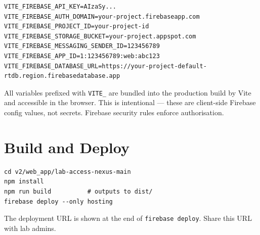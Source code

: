 \begin{lstlisting}[caption={v2/web\_app/lab-access-nexus-main/.env}]
VITE_FIREBASE_API_KEY=AIzaSy...
VITE_FIREBASE_AUTH_DOMAIN=your-project.firebaseapp.com
VITE_FIREBASE_PROJECT_ID=your-project-id
VITE_FIREBASE_STORAGE_BUCKET=your-project.appspot.com
VITE_FIREBASE_MESSAGING_SENDER_ID=123456789
VITE_FIREBASE_APP_ID=1:123456789:web:abc123
VITE_FIREBASE_DATABASE_URL=https://your-project-default-rtdb.region.firebasedatabase.app
\end{lstlisting}

All variables prefixed with \texttt{VITE\_} are bundled into the production build by Vite and accessible in the browser. This is intentional --- these are client-side Firebase config values, not secrets. Firebase security rules enforce authorisation.

\section{Build and Deploy}

\begin{lstlisting}[style=bashstyle]
cd v2/web_app/lab-access-nexus-main
npm install
npm run build          # outputs to dist/
firebase deploy --only hosting
\end{lstlisting}

The deployment URL is shown at the end of \texttt{firebase deploy}. Share this URL with lab admins.

